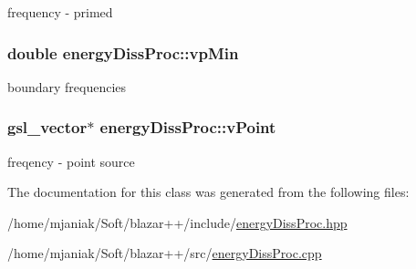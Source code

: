 frequency -\/ primed \hypertarget{classenergyDissProc_aafedd3c012010a8e8aa34247660fea3b}{
\subsubsection[{vp\-Min}]{\setlength{\rightskip}{0pt plus 5cm}double energy\-Diss\-Proc\-::vp\-Min}}\label{classenergyDissProc_aafedd3c012010a8e8aa34247660fea3b}
boundary frequencies \hypertarget{classenergyDissProc_a1f075543ccaa902a20787c032822d8f4}{
\subsubsection[{v\-Point}]{\setlength{\rightskip}{0pt plus 5cm}gsl\-\_\-vector$\ast$ energy\-Diss\-Proc\-::v\-Point}}\label{classenergyDissProc_a1f075543ccaa902a20787c032822d8f4}
freqency -\/ point source 

The documentation for this class was generated from the following files\-:\begin{DoxyCompactItemize}
\item 
/home/mjaniak/\-Soft/blazar++/include/\hyperlink{energyDissProc_8hpp}{energy\-Diss\-Proc.\-hpp}\item 
/home/mjaniak/\-Soft/blazar++/src/\hyperlink{energyDissProc_8cpp}{energy\-Diss\-Proc.\-cpp}\end{DoxyCompactItemize}
